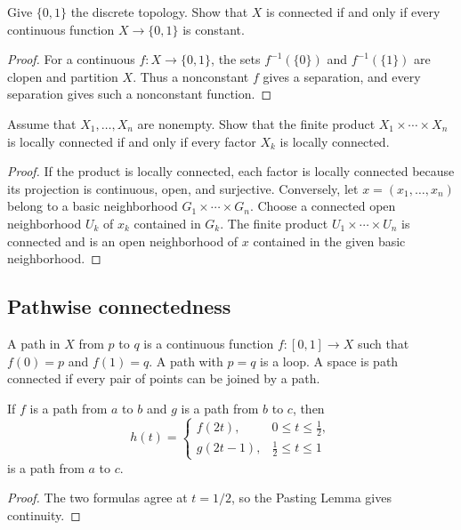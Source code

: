 \begin{ex}
Give $\{0,1\}$ the discrete topology. Show that $X$ is connected if and only
if every continuous function $X\to\{0,1\}$ is constant.
\end{ex}

\begin{proof}
For a continuous $f:X\to\{0,1\}$, the sets $f^{-1}(\{0\})$ and
$f^{-1}(\{1\})$ are clopen and partition $X$. Thus a nonconstant $f$ gives a
separation, and every separation gives such a nonconstant function.
\end{proof}

\begin{ex}
Assume that $X_1,\ldots,X_n$ are nonempty. Show that the finite product
$X_1\times\cdots\times X_n$ is locally connected if and only if every
factor $X_k$ is locally connected.
\end{ex}

\begin{proof}
If the product is locally connected, each factor is locally connected because
its projection is continuous, open, and surjective. Conversely, let
$x=(x_1,\ldots,x_n)$ belong to a basic neighborhood
$G_1\times\cdots\times G_n$. Choose a connected open neighborhood
$U_k$ of $x_k$ contained in $G_k$. The finite product
$U_1\times\cdots\times U_n$ is connected and is an open neighborhood of $x$
contained in the given basic neighborhood.
\end{proof}

\subsection{Pathwise connectedness}

\begin{de}
A path in $X$ from $p$ to $q$ is a continuous function
$f:[0,1]\to X$ such that $f(0)=p$ and $f(1)=q$. A path with $p=q$ is a loop.
A space is path connected if every pair of points can be joined by a path.
\end{de}

\begin{thm}
If $f$ is a path from $a$ to $b$ and $g$ is a path from $b$ to $c$, then
\[
h(t)=
\begin{cases}
f(2t),&0\leq t\leq\tfrac12,\\
g(2t-1),&\tfrac12\leq t\leq1
\end{cases}
\]
is a path from $a$ to $c$.
\end{thm}

\begin{proof}
The two formulas agree at $t=1/2$, so the Pasting Lemma gives continuity.
\end{proof}

